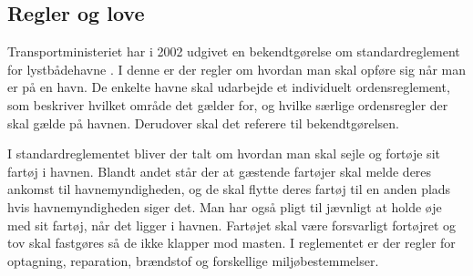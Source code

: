 \subsection{Regler og love}
Transportministeriet har i 2002 udgivet en bekendtgørelse om standardreglement for lystbådehavne \cite{standardreglement}. I denne er der regler om hvordan man skal opføre sig når man er på en havn. De enkelte havne skal udarbejde et individuelt ordensreglement, som beskriver hvilket område det gælder for, og hvilke særlige ordensregler der skal gælde på havnen. Derudover skal det referere til bekendtgørelsen.

I standardreglementet bliver der talt om hvordan man skal sejle og fortøje sit fartøj i havnen. Blandt andet står der at gæstende fartøjer skal melde deres ankomst til havnemyndigheden, og de skal flytte deres fartøj til en anden plads hvis havnemyndigheden siger det. Man har også pligt til jævnligt at holde øje med sit fartøj, når det ligger i havnen. Fartøjet skal være forsvarligt fortøjret og tov skal fastgøres så de ikke klapper mod masten. I reglementet er der regler for optagning, reparation, brændstof og forskellige miljøbestemmelser.
